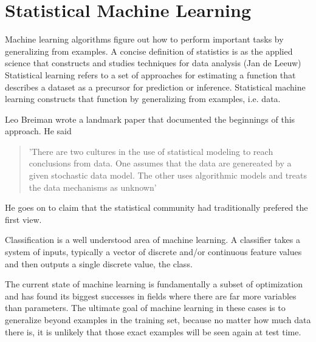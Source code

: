 

\section{Statistical Machine Learning}

Machine learning algorithms figure out how to perform important tasks by generalizing from examples. A concise definition of statistics is as the applied science that constructs and studies techniques for data analysis (Jan de Leeuw) Statistical learning refers to a set of approaches for estimating a function that describes a dataset as a precursor for prediction or inference. \cite{James2013} Statistical machine learning constructs that function by generalizing from examples, i.e. data.

Leo Breiman wrote a landmark paper that documented the beginnings of this approach. He said 
\begin{quote}
'There are two cultures in the use of statistical modeling to reach conclusions from data. One assumes that the data are genereated by a given stochastic data model. The other uses algorithmic models and treats the data mechanisms as unknown' \cite{Breiman2001}
\end{quote} He goes on to claim that the statistical community had traditionally prefered the first view.

Classification is a well understood area of machine learning. A classifier takes a system of inputs, typically a vector of discrete and/or continuous feature values and then outputs a single discrete value, the class. \cite{Domingos2012}

The current state of machine learning is fundamentally a subset of optimization and has found its biggest successes in fields where there are far more variables than parameters. The ultimate goal of machine learning in these cases is to generalize beyond examples in the training set, because no matter how much data there is, it is unlikely that those exact examples will be seen again at test time. \cite{Domingos2012} 


